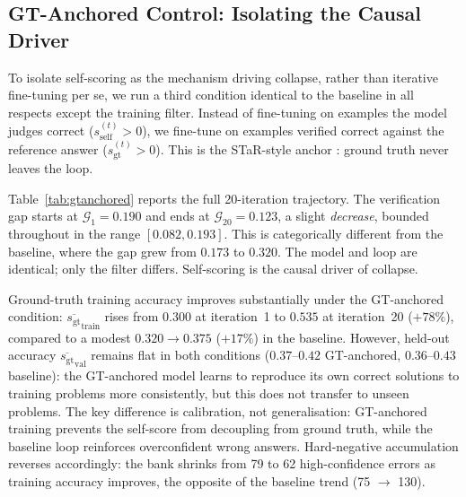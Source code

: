 \documentclass{article}
\newcommand{\gap}{\mathcal{G}}          %
\newcommand{\self}{s_{\text{self}}}     %
\newcommand{\gt}{s_{\text{gt}}}         %
\begin{document}
\subsection{GT-Anchored Control: Isolating the Causal Driver}

To isolate self-scoring as the mechanism driving collapse, rather than
iterative fine-tuning per se, we run a third condition identical to the
baseline in all respects except the training filter.
Instead of fine-tuning on examples the model judges correct
($\self^{(t)} > 0$), we fine-tune on examples verified correct against the
reference answer ($\gt^{(t)} > 0$).
This is the STaR-style anchor \citep{zelikman2022star}: ground truth never
leaves the loop.

Table~\ref{tab:gtanchored} reports the full 20-iteration trajectory.
The verification gap starts at $\gap_1 = 0.190$ and ends at
$\gap_{20} = 0.123$, a slight \emph{decrease}, bounded throughout in the
range $[0.082, 0.193]$.
This is categorically different from the baseline, where the gap grew
from $0.173$ to $0.320$.
The model and loop are identical; only the filter differs.
Self-scoring is the causal driver of collapse.

Ground-truth training accuracy improves substantially under the
GT-anchored condition: $\overline{\gt}_{\text{train}}$ rises from $0.300$
at iteration~1 to $0.535$ at iteration~20 ($+78\%$), compared to a modest
$0.320 \to 0.375$ ($+17\%$) in the baseline.
However, held-out accuracy $\overline{\gt}_\text{val}$ remains flat in both
conditions ($0.37$--$0.42$ GT-anchored, $0.36$--$0.43$ baseline): the
GT-anchored model learns to reproduce its own correct solutions to training
problems more consistently, but this does not transfer to unseen problems.
The key difference is calibration, not generalisation: GT-anchored
training prevents the self-score from decoupling from ground truth, while
the baseline loop reinforces overconfident wrong answers.
Hard-negative accumulation reverses accordingly: the bank shrinks from 79
to 62 high-confidence errors as training accuracy improves, the opposite of
the baseline trend (75 $\to$ 130).
\end{document}
